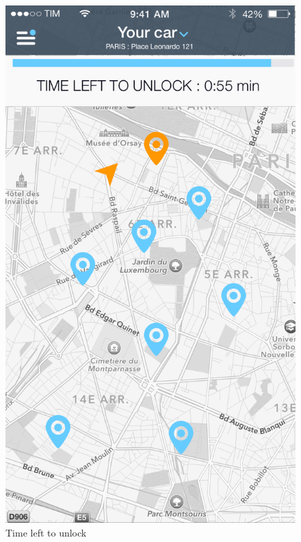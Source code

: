 \documentclass[12pt]{article}
\begin{document}
\begin{figure}
 	 	  \includegraphics[scale=0.25]{Images/mobileApp/TimeLeft.png}
		  \caption{Time left to unlock}
		  \endminipage
 	 	\end{figure}
 	 	
\end{document}
